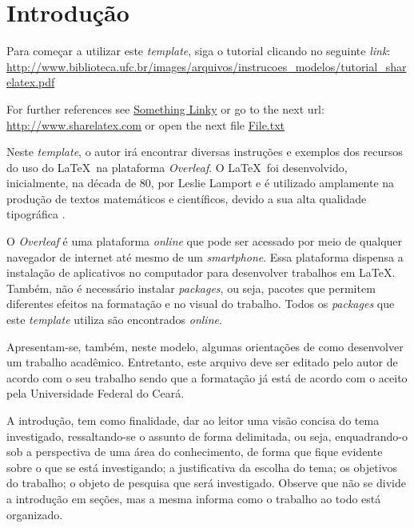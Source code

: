 \chapter{Introdução}
\label{chap:introducao}


Para começar a utilizar este \textit{template}, siga o tutorial clicando no seguinte \textit{link}:
\url{http://www.biblioteca.ufc.br/images/arquivos/instrucoes_modelos/tutorial_sharelatex.pdf}


For further references see \href{http://www.sharelatex.com}{Something Linky} or go to the next url: \url{http://www.sharelatex.com} or open the next file \href{run:./file.txt}{File.txt}

Neste \textit{template}, o autor irá encontrar diversas instruções e exemplos dos recursos do uso do \LaTeX~na plataforma \textit{Overleaf}. O \LaTeX~foi desenvolvido, inicialmente, na década de 80, por Leslie Lamport e é utilizado amplamente na produção de textos matemáticos e científicos, devido a sua alta qualidade tipográfica \cite{goossens1994latex}. 

O \textit{Overleaf} é uma plataforma \textit{online} que pode ser acessado por meio de qualquer navegador de internet até mesmo de um \textit{smartphone}. Essa plataforma dispensa a instalação de aplicativos no computador para desenvolver trabalhos em \LaTeX. Também, não é necessário instalar \textit{packages}, ou seja, pacotes que permitem diferentes efeitos na formatação e no visual do trabalho. Todos os \textit{packages} que este \textit{template} utiliza são encontrados \textit{online}. 

Apresentam-se, também, neste modelo, algumas orientações de como desenvolver um trabalho acadêmico. Entretanto, este arquivo deve ser editado pelo autor de acordo com o seu trabalho sendo que a formatação já está de acordo com o aceito pela Universidade Federal do Ceará.  

A introdução, tem como finalidade, dar ao leitor uma visão concisa do tema investigado, ressaltando-se o assunto de forma delimitada, ou seja, enquadrando-o sob a perspectiva de uma área do conhecimento, de forma que fique evidente sobre o que se está investigando; a justificativa da escolha do tema; os objetivos do trabalho; o objeto de pesquisa que será investigado. Observe que não se divide a introdução em seções, mas a mesma informa como o trabalho ao todo está organizado.



